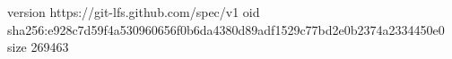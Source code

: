 version https://git-lfs.github.com/spec/v1
oid sha256:e928c7d59f4a530960656f0b6da4380d89adf1529c77bd2e0b2374a2334450e0
size 269463
